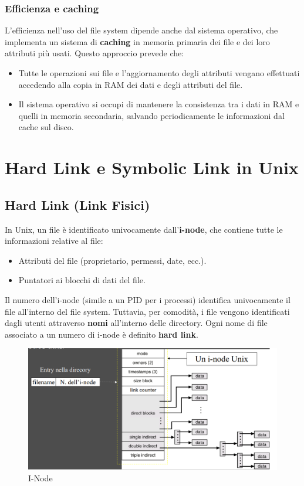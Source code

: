 \subsubsection{Efficienza e caching}
L’efficienza nell’uso del file system dipende anche dal sistema operativo, che implementa un sistema di \textbf{caching} in memoria primaria dei file e dei loro attributi più usati. Questo approccio prevede che:
\begin{itemize}
    \item Tutte le operazioni sui file e l’aggiornamento degli attributi vengano effettuati accedendo alla copia in RAM dei dati e degli attributi del file.
    \item Il sistema operativo si occupi di mantenere la consistenza tra i dati in RAM e quelli in memoria secondaria, salvando periodicamente le informazioni dal cache sul disco.
\end{itemize}

\section{Hard Link e Symbolic Link in Unix}

\subsection{Hard Link (Link Fisici)}
In Unix, un file è identificato univocamente dall'\textbf{i-node}, che contiene tutte le informazioni relative al file:
\begin{itemize}
    \item Attributi del file (proprietario, permessi, date, ecc.).
    \item Puntatori ai blocchi di dati del file.
\end{itemize}
Il numero dell'i-node (simile a un PID per i processi) identifica univocamente il file all'interno del file system. Tuttavia, per comodità, i file vengono identificati dagli utenti attraverso \textbf{nomi} all'interno delle directory. Ogni nome di file associato a un numero di i-node è definito \textbf{hard link}.

\begin{figure}[h] \centering \includegraphics[width=0.50\linewidth]{images/i_node_liinkfile.png} \caption{I-Node} \label{fig:14.4b} \end{figure}

